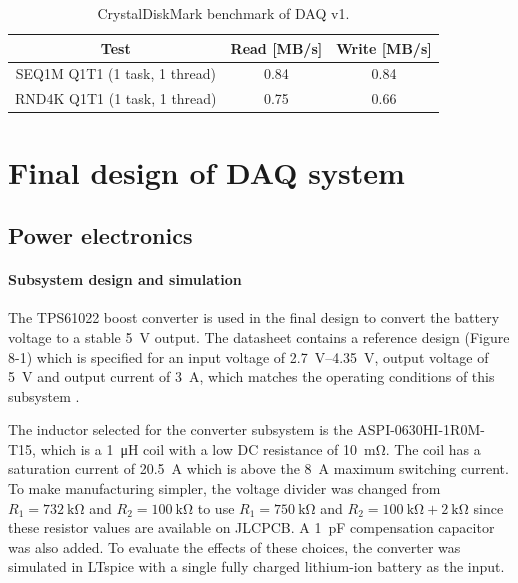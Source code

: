 \documentclass[a4paper,11pt]{article}
\begin{document}
\begin{table}[H]
  \centering
  \begin{tabular}{|c|c|c|}
    Test                          & Read [MB/s] & Write [MB/s] \\
    \hline
    SEQ1M Q1T1 (1 task, 1 thread) & 0.84        & 0.84         \\
    RND4K Q1T1 (1 task, 1 thread) & 0.75        & 0.66         \\
  \end{tabular}
  \caption{CrystalDiskMark benchmark of DAQ v1.}
  \label{tabl:daq-v1-diskmark}
\end{table}

\section{Final design of DAQ system}

\subsection{Power electronics}

\paragraph{Subsystem design and simulation}

The TPS61022 boost converter is used in the final design to convert the battery voltage to a stable \SI{5}{\volt} output. The datasheet contains a reference design (Figure 8-1) which is specified for an input voltage of \SIrange{2.7}{4.35}{\volt}, output voltage of \SI{5}{\volt} and output current of \SI{3}{\ampere}, which matches the operating conditions of this subsystem \cite{ti2021tps61022}.

The inductor selected for the converter subsystem is the ASPI-0630HI-1R0M-T15, which is a \SI{1}{\micro\henry} coil with a low DC resistance of \SI{10}{\milli\ohm}. The coil has a saturation current of \SI{20.5}{\ampere} which is above the \SI{8}{\ampere} maximum switching current. To make manufacturing simpler, the voltage divider was changed from $R_1=\SI{732}{\kilo\ohm}$ and $R_2=\SI{100}{\kilo\ohm}$ to use $R_1=\SI{750}{\kilo\ohm}$ and $R_2=\SI{100}{\kilo\ohm}+\SI{2}{\kilo\ohm}$ since these resistor values are available on JLCPCB.  A \SI{1}{\pico\farad} compensation capacitor was also added. To evaluate the effects of these choices, the converter was simulated in LTspice with a single fully charged lithium-ion battery as the input.
\end{document}
